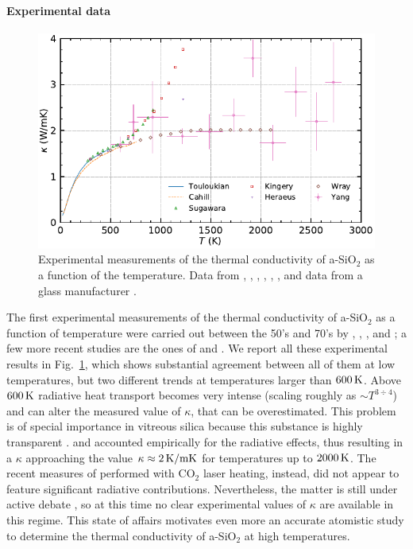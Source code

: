 \paragraph{Experimental data}
\begin{figure}
    \centering
    \includegraphics[width=\textwidth]{chapters/chapter6/figures/silica_expkappa.pdf}
    \caption{Experimental measurements of the thermal conductivity of a-SiO$_2$ as a function of the temperature. Data from \citet{Touloukian1971}, \citet{Cahill1990}, \citet{Sugawara1969}, \citet{Kingery1955}, \citet{Wray1959}, \citet{Yang2009}, and data from a glass manufacturer \cite{Heraeus2010}. 
    }
    \label{fig:silica-exp-kappa}
\end{figure}
The first experimental measurements of the thermal conductivity of a-SiO$_2$ as a function of temperature were carried out between the 50's and 70's by \citet{Kingery1955}, \citet{Wray1959}, \citet{Sugawara1969}, and \citet{Touloukian1971}; a few more recent studies are the ones of \citet{Cahill1990} and \citet{Yang2009}. 
We report all these experimental results in Fig.~\ref{fig:silica-exp-kappa}, which shows substantial agreement between all of them at low temperatures, but two different trends at temperatures larger than $600\,\mathrm{K}$. 
Above $600\,\mathrm{K}$ radiative heat transport becomes very intense (scaling roughly as $\sim T^{3\div 4}$) and can alter the measured value of $\kappa$, that can be overestimated. This problem is of special importance in vitreous silica because this substance is highly transparent \cite{Carwile1966, Cahill1990, Gardon1961}. \citet{Cahill1990} and \citet{Wray1959} accounted empirically for the radiative effects, thus resulting in a $\kappa$ approaching the value $\kappa\approx 2\,\mathrm{K/mK}$ for temperatures up to $2000\,\mathrm{K}$. The recent measures of \citet{Yang2009} performed with CO$_2$ laser heating, instead, did not appear to feature significant radiative contributions. 
Nevertheless, the matter is still under active debate \cite{Bouchut2004}, so at this time no clear experimental values of $\kappa$ are available in this regime. This state of affairs motivates even more an accurate atomistic study to determine the thermal conductivity of a-SiO$_2$ at high temperatures. 

